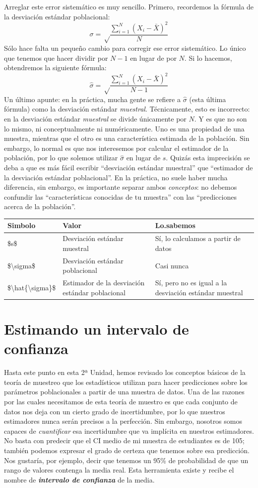 \documentclass[spanish,]{book}
\begin{document}
Arreglar este error sistemático es muy sencillo. Primero, recordemos la
fórmula de la desviación estándar poblacional: \[
\sigma = \sqrt\frac{\sum_{i=1}^N (X_i - \bar{X})^2}{N} 
\] Sólo hace falta un pequeño cambio para corregir ese error
sistemático. Lo único que tenemos que hacer dividir por \(N-1\) en lugar
de por \(N\). Si lo hacemos, obtendremos la siguiente fórmula: \[
\hat\sigma = \sqrt\frac{\sum_{i=1}^N (X_i - \bar{X})^2}{N-1} 
\] Un último apunte: en la práctica, mucha gente se refiere a
\(\hat{\sigma}\) (esta última fórmula) como la desviación estándar
\emph{muestral}. Técnicamente, esto es incorrecto: en la desviación
estándar \emph{muestral} se divide únicamente por \(N\). Y es que no son
lo mismo, ni conceptualmente ni numéricamente. Uno es una propiedad de
una muestra, mientras que el otro es una característica estimada de la
población. Sin embargo, lo normal es que nos interesemos por calcular el
estimador de la población, por lo que solemos utilizar \(\hat\sigma\) en
lugar de \(s\). Quizás esta imprecisión se deba a que es más fácil
escribir ``desviación estándar muestral'' que ``estimador de la
desviación estándar poblacional''. En la práctica, no suele haber mucha
diferencia, sin embargo, es importante separar ambos \emph{conceptos}:
no debemos confundir las ``características conocidas de tu muestra'' con
las ``predicciones acerca de la población''.

\begin{tabular}{l|l|l}
\hline
Simbolo & Valor & Lo.sabemos\\
\hline
\$s\$ & Desviación estándar muestral & Sí, lo calculamos a partir de datos\\
\hline
\$\textbackslash{}sigma\$ & Desviación estándar poblacional & Casi nunca\\
\hline
\$\textbackslash{}hat\{\textbackslash{}sigma\}\$ & Estimador de la desviación estándar poblacional & Sí, pero no es igual a la desviación estándar muestral\\
\hline
\end{tabular}

\section{Estimando un intervalo de confianza}\label{ci}

Hasta este punto en esta 2ª Unidad, hemos revisado los conceptos básicos
de la teoría de muestreo que los estadísticos utilizan para hacer
predicciones sobre los parámetros poblacionales a partir de una muestra
de datos. Una de las razones por las cuales necesitamos de esta teoría
de muestro es que cada conjunto de datos nos deja con un cierto grado de
incertidumbre, por lo que nuestros estimadores nunca serán precisos a la
perfección. Sin embargo, nosotros somos capaces de \emph{cuantificar}
esa incertidumbre que va implícita en nuestros estimadores. No basta con
predecir que el CI medio de mi muestra de estudiantes es de 105; también
podemos expresar el grado de certeza que tenemos sobre esa predicción.\\
Nos gustaría, por ejemplo, decir que tenemos un 95\% de probabilidad de
que un rango de valores contenga la media real. Esta herramienta existe
y recibe el nombre de \textbf{\emph{intervalo de confianza}} de la
media.
\end{document}
